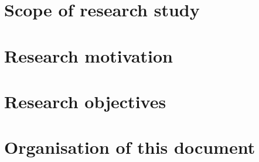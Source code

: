 
\section{Scope of research study}

\section{Research motivation}

\section{Research objectives}

\section{Organisation of this document}

